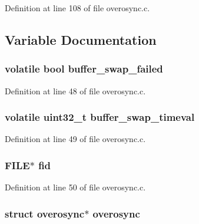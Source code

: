 \-Definition at line 108 of file overosync.\-c.



\subsection{\-Variable \-Documentation}
\hypertarget{group___overo_sync_module_gaf3669c85af58042a7e4440bb29725642}{
\subsubsection[{buffer\-\_\-swap\-\_\-failed}]{\setlength{\rightskip}{0pt plus 5cm}volatile bool {\bf buffer\-\_\-swap\-\_\-failed}}}\label{group___overo_sync_module_gaf3669c85af58042a7e4440bb29725642}


\-Definition at line 48 of file overosync.\-c.

\hypertarget{group___overo_sync_module_ga5c2ff66cb86affccb720ee8e0e55cbd7}{
\subsubsection[{buffer\-\_\-swap\-\_\-timeval}]{\setlength{\rightskip}{0pt plus 5cm}volatile uint32\-\_\-t {\bf buffer\-\_\-swap\-\_\-timeval}}}\label{group___overo_sync_module_ga5c2ff66cb86affccb720ee8e0e55cbd7}


\-Definition at line 49 of file overosync.\-c.

\hypertarget{group___overo_sync_module_ga646170d6f9e3b0d001430a771e9f2247}{
\subsubsection[{fid}]{\setlength{\rightskip}{0pt plus 5cm}\-F\-I\-L\-E$\ast$ {\bf fid}}}\label{group___overo_sync_module_ga646170d6f9e3b0d001430a771e9f2247}


\-Definition at line 50 of file overosync.\-c.

\hypertarget{group___overo_sync_module_ga34ce26c29a4ded07cf5f562126682017}{
\subsubsection[{overosync}]{\setlength{\rightskip}{0pt plus 5cm}struct {\bf overosync}$\ast$ {\bf overosync}}}\label{group___overo_sync_module_ga34ce26c29a4ded07cf5f562126682017}


